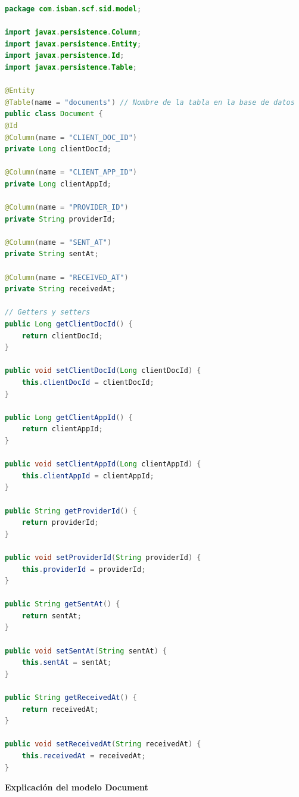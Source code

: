 \documentclass[draft]{scrbook}
\begin{document}
\begin{lstlisting}[language=Java]
package com.isban.scf.sid.model;

import javax.persistence.Column;
import javax.persistence.Entity;
import javax.persistence.Id;
import javax.persistence.Table;

@Entity
@Table(name = "documents") // Nombre de la tabla en la base de datos
public class Document {
@Id
@Column(name = "CLIENT_DOC_ID")
private Long clientDocId; 

@Column(name = "CLIENT_APP_ID")
private Long clientAppId; 

@Column(name = "PROVIDER_ID")
private String providerId; 

@Column(name = "SENT_AT")
private String sentAt;

@Column(name = "RECEIVED_AT")
private String receivedAt;

// Getters y setters
public Long getClientDocId() {
    return clientDocId;
}

public void setClientDocId(Long clientDocId) {
    this.clientDocId = clientDocId;
}

public Long getClientAppId() {
    return clientAppId;
}

public void setClientAppId(Long clientAppId) {
    this.clientAppId = clientAppId;
}

public String getProviderId() {
    return providerId;
}

public void setProviderId(String providerId) {
    this.providerId = providerId;
}

public String getSentAt() {
    return sentAt;
}

public void setSentAt(String sentAt) {
    this.sentAt = sentAt;
}

public String getReceivedAt() {
    return receivedAt;
}

public void setReceivedAt(String receivedAt) {
    this.receivedAt = receivedAt;
}

\end{lstlisting}

\textbf{Explicación del modelo Document}
\end{document}
